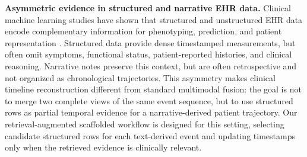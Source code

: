 \noindent
\textbf{Asymmetric evidence in structured and narrative EHR data.}
Clinical machine learning studies have shown that structured and unstructured EHR data encode complementary information for phenotyping, prediction, and patient representation \cite{ch08:moldwin2021empirical,liu2022multimodal,seinen2025using}.
Structured data provide dense timestamped measurements, but often omit symptoms, functional status, patient-reported histories, and clinical reasoning.
Narrative notes preserve this context, but are often retrospective and not organized as chronological trajectories.
This asymmetry makes clinical timeline reconstruction different from standard multimodal fusion: the goal is not to merge two complete views of the same event sequence, but to use structured rows as partial temporal evidence for a narrative-derived patient trajectory.
Our retrieval-augmented scaffolded workflow is designed for this setting, selecting candidate structured rows for each text-derived event and updating timestamps only when the retrieved evidence is clinically relevant.


